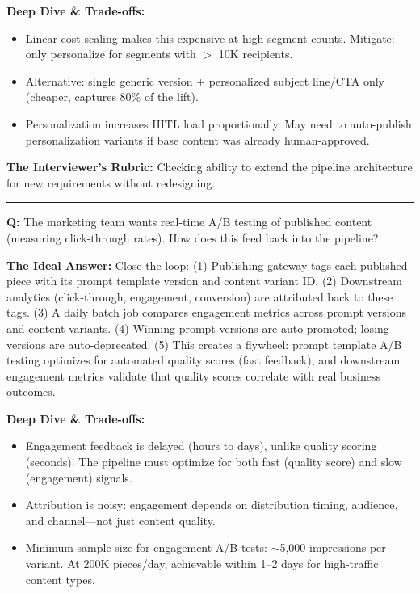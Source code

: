 \textbf{Deep Dive \& Trade-offs:}
\begin{itemize}
  \item Linear cost scaling makes this expensive at high segment counts. Mitigate: only personalize for segments with $>$ 10K recipients.
  \item Alternative: single generic version + personalized subject line/CTA only (cheaper, captures 80\% of the lift).
  \item Personalization increases HITL load proportionally. May need to auto-publish personalization variants if base content was already human-approved.
\end{itemize}

\textbf{The Interviewer's Rubric:} Checking ability to extend the pipeline architecture for new requirements without redesigning.

\bigskip\hrule\bigskip

\textbf{Q:} The marketing team wants real-time A/B testing of published content (measuring click-through rates). How does this feed back into the pipeline?

\textbf{The Ideal Answer:} Close the loop: (1) Publishing gateway tags each published piece with its prompt template version and content variant ID. (2) Downstream analytics (click-through, engagement, conversion) are attributed back to these tags. (3) A daily batch job compares engagement metrics across prompt versions and content variants. (4) Winning prompt versions are auto-promoted; losing versions are auto-deprecated. (5) This creates a flywheel: prompt template A/B testing optimizes for automated quality scores (fast feedback), and downstream engagement metrics validate that quality scores correlate with real business outcomes.

\textbf{Deep Dive \& Trade-offs:}
\begin{itemize}
  \item Engagement feedback is delayed (hours to days), unlike quality scoring (seconds). The pipeline must optimize for both fast (quality score) and slow (engagement) signals.
  \item Attribution is noisy: engagement depends on distribution timing, audience, and channel---not just content quality.
  \item Minimum sample size for engagement A/B tests: $\sim$5,000 impressions per variant. At 200K pieces/day, achievable within 1--2 days for high-traffic content types.
\end{itemize}

